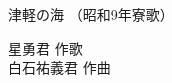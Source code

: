 \documentclass[10pt,b5j]{tarticle} %
\begin{document}
\begin{minipage}[c]{0.7\hsize} %
    \begin{center}
        {\LARGE
            津軽の海 %
        }
        {\small 
            （昭和9年寮歌） %
        }
    \end{center}
\end{minipage}
\begin{minipage}[c]{0.3\hsize} %
    \begin{flushright} %
        星勇君 作歌\\白石祐義君 作曲 %
    \end{flushright}
\end{minipage}
\end{document}
